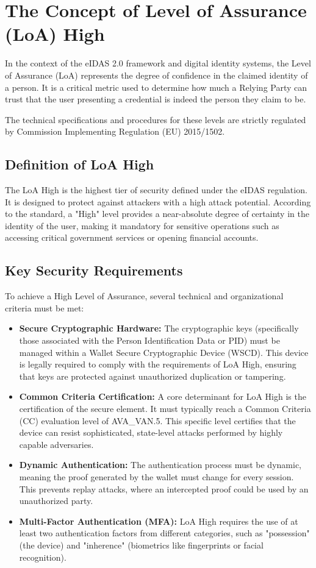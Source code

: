 \documentclass[binding=0.6cm,oneside,noexaminfo]{sapthesis}
\begin{document}
\clearpage

\section{The Concept of Level of Assurance (LoA) High}
\label{loa}
In the context of the eIDAS 2.0 framework and digital identity systems, the Level of Assurance (LoA) represents the degree 
of confidence in the claimed identity of a person. It is a critical metric used to determine how much a Relying Party can trust
that the user presenting a credential is indeed the person they claim to be.

The technical specifications and procedures for these levels are strictly regulated by Commission Implementing Regulation (EU) 
2015/1502.
\subsection{Definition of LoA High}
The LoA High is the highest tier of security defined under the eIDAS regulation. It is designed to protect against attackers
with a high attack potential. According to the standard, a "High" level provides a near-absolute degree of certainty in the 
identity of the user, making it mandatory for sensitive operations such as accessing critical government services or opening 
financial accounts.

\subsection{Key Security Requirements}
To achieve a High Level of Assurance, several technical and organizational criteria must be met:
\begin{itemize}
      \item \textbf{Secure Cryptographic Hardware:} The cryptographic keys (specifically those associated with the Person Identification Data or PID) must be managed within a Wallet Secure Cryptographic Device (WSCD). This device is legally required to comply with the requirements of LoA High, ensuring that keys are protected against unauthorized duplication or tampering.
      \item \textbf{Common Criteria Certification:} A core determinant for LoA High is the certification of the secure element. It must typically reach a Common Criteria (CC) evaluation level of AVA\_VAN.5. This specific level certifies that the device can resist sophisticated, state-level attacks performed by highly capable adversaries.
      \item \textbf{Dynamic Authentication:} The authentication process must be dynamic, meaning the proof generated by the wallet must change for every session. This prevents replay attacks, where an intercepted proof could be used by an unauthorized party.
      \item \textbf{Multi-Factor Authentication (MFA):} LoA High requires the use of at least two authentication factors from different categories, such as "possession" (the device) and "inherence" (biometrics like fingerprints or facial recognition).
\end{itemize}
\end{document}
